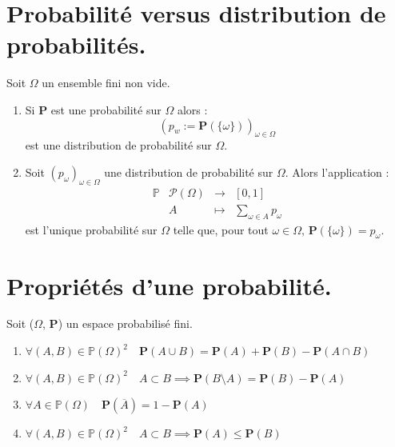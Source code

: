 \documentclass{article}
\begin{document}
\section{Probabilité versus distribution de probabilités.}

Soit $\Omega$ un ensemble fini non vide. 

\begin{enumerate}[label=(\alph*)]
    \item Si $\mathbf{P}$ est une probabilité sur $\Omega$ alors : 
    \[ (p_w := \mathbf{P}(\{\omega\}))_{\omega \in \Omega}\]
    est une distribution de probabilité sur $\Omega$.
    \item Soit $(p_{\omega})_{\omega \in \Omega}$ une distribution de probabilité sur $\Omega$. Alors l'application : 
   \[
        \begin{array}{c|ccc} %
        \mathbb{P} & \mathcal{P}(\Omega) & \longrightarrow & [0,1] \\[0.3em]
                    & A                   & \longmapsto          & \displaystyle\sum_{\omega\in A} p_\omega %
        \end{array}
    \]
    est l'unique probabilité sur $\Omega$ telle que, pour tout $\omega \in \Omega\text{, } \mathbf{P}(\{\omega\}) = p_{\omega}.$
\end{enumerate}

\section{Propriétés d'une probabilité.}

Soit ($\Omega$, $\mathbf{P}$) un espace probabilisé fini.

\begin{enumerate}[label=(\alph*)]
    \item $ \forall (A, B) \in \mathbb{P}(\Omega)^2 \quad \mathbf{P}(A \cup B) = \mathbf{P}(A) + \mathbf{P}(B) - \mathbf{P}(A \cap B) $ 
    \item $ \forall (A, B) \in \mathbb{P}(\Omega)^2 \quad A \subset B \implies \mathbf{P}(B \setminus A) = \mathbf{P}(B) - \mathbf{P}(A) $ 
    \item $ \forall A \in \mathbb{P}(\Omega) \quad \mathbf{P}(\overline{A}) = 1 - \mathbf{P}(A) $ 
    \item $ \forall (A, B) \in \mathbb{P}(\Omega)^2 \quad A \subset B \implies \mathbf{P}(A) \leq \mathbf{P}(B) $ 
\end{enumerate}
\end{document}
